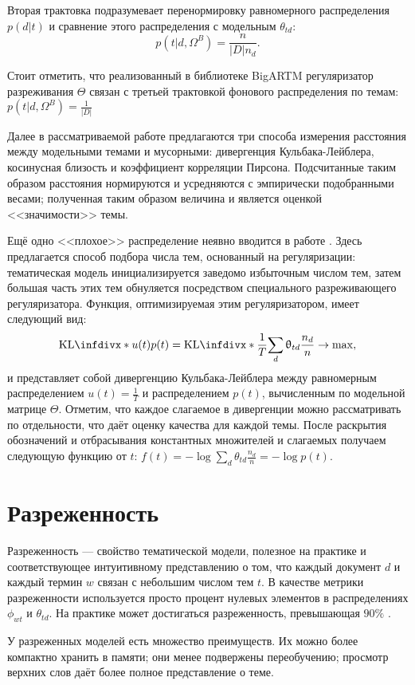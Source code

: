 Вторая трактовка подразумевает перенормировку равномерного распределения $p(d|t)$ и сравнение этого распределения с модельным $\theta_{td}$:
$$
    p(t|d, \Omega^B) = \frac{n}{|D| n_d}.
$$

Стоит отметить, что реализованный в библиотеке BigARTM регуляризатор разреживания $\Theta$ связан с третьей трактовкой фонового распределения по темам: $p(t|d, \Omega^B) = \frac{1}{|D|} $

Далее в рассматриваемой работе предлагаются три способа измерения расстояния между модельными темами и мусорными: дивергенция Кульбака-Лейблера, косинусная близость и коэффициент корреляции Пирсона. Подсчитанные таким образом расстояния нормируются и усредняются с эмпирически подобранными весами; полученная таким образом величина и является оценкой <<значимости>> темы.

Ещё одно <<плохое>> распределение неявно вводится в работе \cite{plavin}. Здесь предлагается способ подбора числа тем, основанный на регуляризации: тематическая модель инициализируется заведомо избыточным числом тем, затем большая часть этих тем обнуляется посредством специального разреживающего регуляризатора. Функция, оптимизируемая этим регуляризатором, имеет следующий вид:
\[
    \textup{KL}\infdiv*{u(t)}{p(t)} = \textup{KL}\infdiv*{\frac{1}{T}}{\sum_d \theta_{td} \frac{n_d}{n}} \rightarrow \max,
\]
и представляет собой дивергенцию Кульбака-Лейблера между равномерным распределением $u(t) = \frac{1}{T}$ и распределением $p(t)$, вычисленным по модельной матрице $\Theta$. Отметим, что каждое слагаемое в дивергенции можно рассматривать по отдельности, что даёт оценку качества для каждой темы. После раскрытия обозначений и отбрасывания константных множителей и слагаемых получаем следующую функцию от $t$:
$f(t) = - \log \sum_d \theta_{td} \frac{n_d}{n} = -\log p(t)$.

\section{Разреженность}

Разреженность --- свойство тематической модели, полезное на практике и соответствующее интуитивному представлению о том, что каждый документ $d$ и каждый термин $w$ связан с небольшим числом тем $t$. В качестве метрики разреженности используется просто процент нулевых элементов в распределениях $\phi_{wt}$ и $\theta_{td}$. На практике может достигаться разреженность, превышающая $90\%$ \cite{potapenko2013robust}.

У разреженных моделей есть множество преимуществ. Их можно более компактно хранить в памяти; они менее подвержены переобучению; просмотр верхних слов даёт более полное представление о теме.


